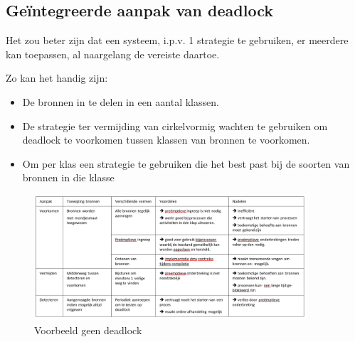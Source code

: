 \subsection{Geïntegreerde aanpak van deadlock}

Het zou beter zijn dat een systeem, i.p.v. 1 strategie te gebruiken, er meerdere kan toepassen, al naargelang de vereiste daartoe.

Zo kan het handig zijn:

\begin{itemize}
\item De bronnen in te delen in een aantal klassen.
\item De strategie ter vermijding van cirkelvormig wachten te gebruiken om deadlock te voorkomen tussen klassen van bronnen te voorkomen.
\item Om per klas een strategie te gebruiken die het best past bij de soorten van bronnen in die klasse
\end{itemize}

 \begin{figure}[htp]
    \centering
            \includegraphics[width=4in]{img/tabelomzettennaartabellatex.PNG}
        \caption{Voorbeeld geen deadlock}
    \label{fig:Voorbeeld geen deadlock}
\end{figure}

